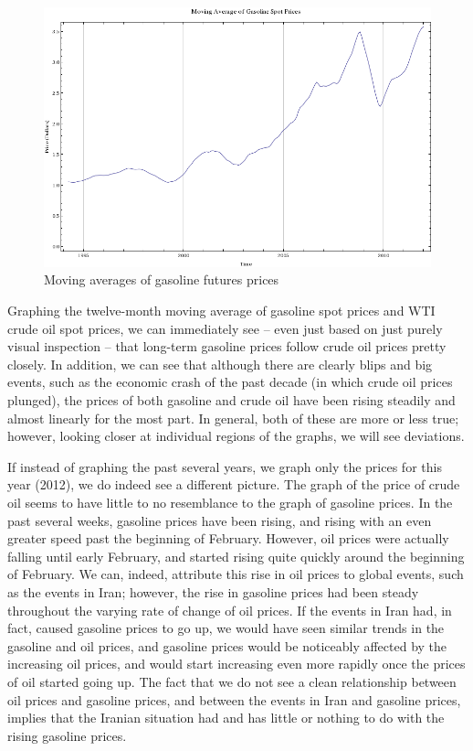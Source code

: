 \documentclass[11pt,twocolumn]{article}
\newcommand{\tab}[0] {\hspace*{24pt}}
\begin{document}
\begin{figure}
    \centering
    \includegraphics[scale=0.5]{images/GasolineMovingAverage.png}\\
    {Moving averages of gasoline futures prices}
\end{figure}

\begin{multicols}{2}
    \tab Graphing the twelve-month moving average of gasoline spot prices and WTI crude oil spot prices, we can immediately see – even just based on just purely visual inspection – that long-term gasoline prices follow crude oil prices pretty closely. In addition, we can see that although there are clearly blips and big events, such as the economic crash of the past decade (in which crude oil prices plunged), the prices of both gasoline and crude oil have been rising steadily and almost linearly for the most part. In general, both of these are more or less true; however, looking closer at individual regions of the graphs, we will see deviations.

    \tab If instead of graphing the past several years, we graph only the prices for this year (2012), we do indeed see a different picture. The graph of the price of crude oil seems to have little to no resemblance to the graph of gasoline prices. In the past several weeks, gasoline prices have been rising, and rising with an even greater speed past the beginning of February. However, oil prices were actually falling until early February, and started rising quite quickly around the beginning of February. We can, indeed, attribute this rise in oil prices to global events, such as the events in Iran; however, the rise in gasoline prices had been steady throughout the varying rate of change of oil prices. If the events in Iran had, in fact, caused gasoline prices to go up, we would have seen similar trends in the gasoline and oil prices, and gasoline prices would be noticeably affected by the increasing oil prices, and would start increasing even more rapidly once the prices of oil started going up. The fact that we do not see a clean relationship between oil prices and gasoline prices, and between the events in Iran and gasoline prices, implies that the Iranian situation had and has little or nothing to do with the rising gasoline prices.
\end{multicols}
\end{document}
